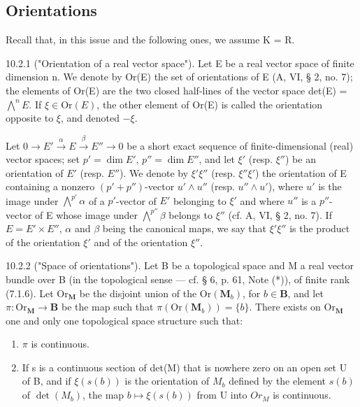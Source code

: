 \subsection{Orientations}

Recall that, in this issue and the following ones, we assume K = R.

10.2.1 ("Orientation of a real vector space"). Let E be a real vector space of finite dimension n. We denote by Or(E) the set of orientations of E (A, VI, § 2, no. 7); the elements of Or(E) are the two closed half-lines of the vector space det(E) = \(\bigwedge^{n} E\). If \(\xi \in \text{Or}(E)\), the other element of Or(E) is called the orientation opposite to \(\xi\), and denoted \(-\xi\).

Let \(0 \to E' \xrightarrow{\alpha} E \xrightarrow{\beta} E'' \to 0\) be a short exact sequence of finite-dimensional (real) vector spaces; set \(p' = \dim E'\), \(p'' = \dim E''\), and let \(\xi'\) (resp. \(\xi''\)) be an orientation of \(E'\) (resp. \(E''\)). We denote by \(\xi'\xi''\) (resp. \(\xi''\xi'\)) the orientation of E containing a nonzero \((p' + p'')\)-vector \(u' \wedge u''\) (resp. \(u'' \wedge u'\)), where \(u'\) is the image under \(\bigwedge^{p'}\alpha\) of a \(p'\)-vector of \(E'\) belonging to \(\xi'\) and where \(u''\) is a \(p''\)-vector of E whose image under \(\bigwedge^{p''}\beta\) belongs to \(\xi''\) (cf. A, VI, § 2, no. 7). If \(E = E' \times E''\), \(\alpha\) and \(\beta\) being the canonical maps, we say that \(\xi'\xi''\) is the product of the orientation \(\xi'\) and of the orientation \(\xi''\).

10.2.2 ("Space of orientations"). Let B be a topological space and M a real vector bundle over B (in the topological sense — cf. § 6, p. 61, Note (*)), of finite rank (7.1.6). Let \(\mathrm{Or}_{\mathbf{M}}\) be the disjoint union of the \(\mathrm{Or}(\mathbf{M}_b)\), for \(b \in \mathbf{B}\), and let \(\pi: \mathrm{Or}_{\mathbf{M}} \to \mathbf{B}\) be the map such that \(\pi(\mathrm{Or}(\mathbf{M}_b)) = \{b\}\). There exists on \(\mathrm{Or}_{\mathbf{M}}\) one and only one topological space structure such that:

\begin{enumerate}
\def\labelenumi{\alph{enumi})}
\item
  \(\pi\) is continuous.
\item
  If s is a continuous section of det(M) that is nowhere zero on an open set U of B, and if \(\xi(s(b))\) is the orientation of \(M_{b}\) defined by the element \(s(b)\) of \(\det(M_{b})\), the map \(b\mapsto\xi(s(b))\) from U into \(Or_{M}\) is continuous.
\end{enumerate}


